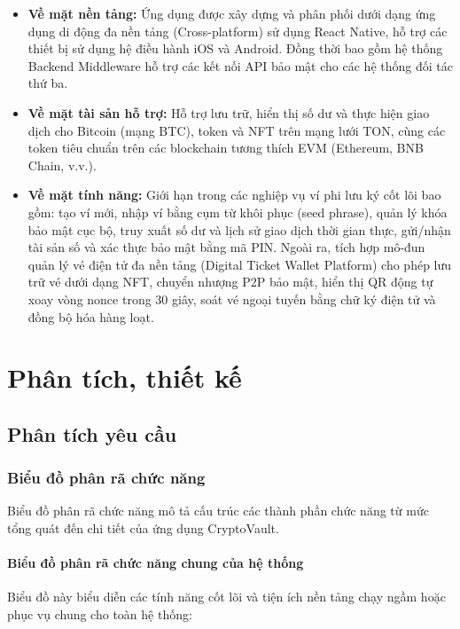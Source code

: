 \documentclass[a4paper]{report}
\begin{document}
\begin{itemize}
    \item \textbf{Về mặt nền tảng:} Ứng dụng được xây dựng và phân phối dưới dạng ứng dụng di động đa nền tảng (Cross-platform) sử dụng React Native, hỗ trợ các thiết bị sử dụng hệ điều hành iOS và Android. Đồng thời bao gồm hệ thống Backend Middleware hỗ trợ các kết nối API bảo mật cho các hệ thống đối tác thứ ba.
    
    \item \textbf{Về mặt tài sản hỗ trợ:} Hỗ trợ lưu trữ, hiển thị số dư và thực hiện giao dịch cho Bitcoin (mạng BTC), token và NFT trên mạng lưới TON, cùng các token tiêu chuẩn trên các blockchain tương thích EVM (Ethereum, BNB Chain, v.v.).
    
    \item \textbf{Về mặt tính năng:} Giới hạn trong các nghiệp vụ ví phi lưu ký cốt lõi bao gồm: tạo ví mới, nhập ví bằng cụm từ khôi phục (seed phrase), quản lý khóa bảo mật cục bộ, truy xuất số dư và lịch sử giao dịch thời gian thực, gửi/nhận tài sản số và xác thực bảo mật bằng mã PIN. Ngoài ra, tích hợp mô-đun quản lý vé điện tử đa nền tảng (Digital Ticket Wallet Platform) cho phép lưu trữ vé dưới dạng NFT, chuyển nhượng P2P bảo mật, hiển thị QR động tự xoay vòng nonce trong 30 giây, soát vé ngoại tuyến bằng chữ ký điện tử và đồng bộ hóa hàng loạt.
\end{itemize}


\chapter{Phân tích, thiết kế}
\section{Phân tích yêu cầu}
\subsection{Biểu đồ phân rã chức năng}

Biểu đồ phân rã chức năng mô tả cấu trúc các thành phần chức năng từ mức tổng quát đến chi tiết của ứng dụng CryptoVault.

\subsubsection{Biểu đồ phân rã chức năng chung của hệ thống}
Biểu đồ này biểu diễn các tính năng cốt lõi và tiện ích nền tảng chạy ngầm hoặc phục vụ chung cho toàn hệ thống:
\end{document}
